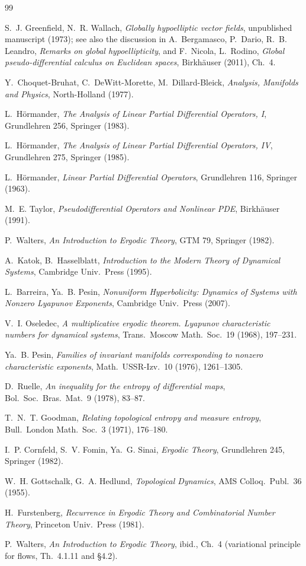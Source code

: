 \documentclass[11pt]{amsart}
\theoremstyle{plain}
\theoremstyle{definition}
\theoremstyle{remark}
\begin{document}
\begin{thebibliography}{99}

 S.~J. Greenfield, N.~R. Wallach,
\emph{Globally hypoelliptic vector fields}, unpublished
manuscript (1973); see also the discussion in
A.~Bergamasco, P.~Dario, R.~B. Leandro,
\emph{Remarks on global hypoellipticity}, and
F.~Nicola, L.~Rodino, \emph{Global pseudo-differential calculus on
Euclidean spaces}, Birkh\"auser (2011), Ch.~4.

 Y.~Choquet-Bruhat, C.~DeWitt-Morette,
M.~Dillard-Bleick, \emph{Analysis, Manifolds and Physics},
North-Holland (1977).

 L.~H\"ormander, \emph{The Analysis of Linear Partial
Differential Operators, I}, Grundlehren 256, Springer (1983).

 L.~H\"ormander, \emph{The Analysis of Linear Partial
Differential Operators, IV}, Grundlehren 275, Springer (1985).

 L.~H\"ormander, \emph{Linear Partial Differential
Operators}, Grundlehren 116, Springer (1963).

 M.~E. Taylor, \emph{Pseudodifferential
Operators and Nonlinear PDE}, Birkh\"auser (1991).

 P.~Walters, \emph{An Introduction to Ergodic
Theory}, GTM 79, Springer (1982).

 A.~Katok, B.~Hasselblatt, \emph{Introduction to the
Modern Theory of Dynamical Systems}, Cambridge Univ.~Press (1995).

 L.~Barreira, Ya.~B. Pesin,
\emph{Nonuniform Hyperbolicity: Dynamics of Systems with Nonzero
Lyapunov Exponents}, Cambridge Univ.~Press (2007).

 V.~I. Oseledec, \emph{A multiplicative ergodic
theorem. Lyapunov characteristic numbers for dynamical systems},
Trans.~Moscow Math.~Soc.~19 (1968), 197--231.

 Ya.~B. Pesin, \emph{Families of invariant manifolds
corresponding to nonzero characteristic exponents}, Math.~USSR-Izv.\
10 (1976), 1261--1305.

 D.~Ruelle, \emph{An inequality for the entropy
of differential maps}, Bol.~Soc.~Bras.~Mat.~9 (1978), 83--87.

 T.~N.~T. Goodman, \emph{Relating topological
entropy and measure entropy}, Bull.~London Math.~Soc.~3 (1971),
176--180.

 I.~P. Cornfeld, S.~V. Fomin, Ya.~G. Sinai,
\emph{Ergodic Theory}, Grundlehren 245, Springer (1982).

 W.~H. Gottschalk, G.~A. Hedlund, \emph{Topological
Dynamics}, AMS Colloq.~Publ.~36 (1955).

 H.~Furstenberg, \emph{Recurrence in
Ergodic Theory and Combinatorial Number Theory}, Princeton Univ.\
Press (1981).

 P.~Walters, \emph{An Introduction to Ergodic
Theory}, ibid., Ch.~4 (variational principle for flows,
Th.~4.1.11 and \S4.2).

\end{thebibliography}
\end{document}

